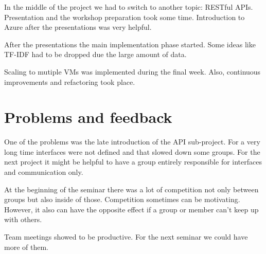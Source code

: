 \documentclass[DIV=calc, paper=a4, fontsize=11pt, twocolumn]{scrartcl}
\begin{document}
In the middle of the project we had to switch to another topic: RESTful APIs.
Presentation and the workshop preparation took some time. 
Introduction to Azure after the presentations was very helpful.

After the presentations the main implementation phase started.
Some ideas like TF-IDF had to be dropped due the large amount of data.

Scaling to mutiple VMs was implemented during the final week. Also, continuous improvements and refactoring took place.


\section*{Problems and feedback}
One of the problems was the late introduction of the API sub-project. 
For a very long time interfaces were not defined and that slowed down some groups. 
For the next project it might be helpful to have a group entirely responsible for interfaces and communication only.

At the beginning of the seminar there was a lot of competition not only between groups but also inside of those. 
Competition sometimes can be motivating. 
However, it also can have the opposite effect if a group or member can't keep up with others.

Team meetings showed to be productive. 
For the next seminar we could have more of them.
\end{document}
